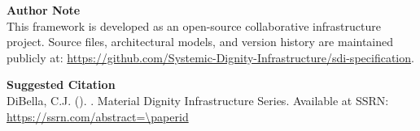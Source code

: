 % 

\vspace{1cm}
\noindent\textbf{Author Note}\\
This framework is developed as an open-source collaborative infrastructure project. 
Source files, architectural models, and version history are maintained publicly at: 
\url{https://github.com/Systemic-Dignity-Infrastructure/sdi-specification}.

\vspace{0.5cm}
\noindent\textbf{Suggested Citation}\\
DiBella, C.J. (\paperdate). \textit{\papertitle}. Material Dignity Infrastructure Series. 
Available at SSRN: \url{https://ssrn.com/abstract=\paperid}

\newpage
